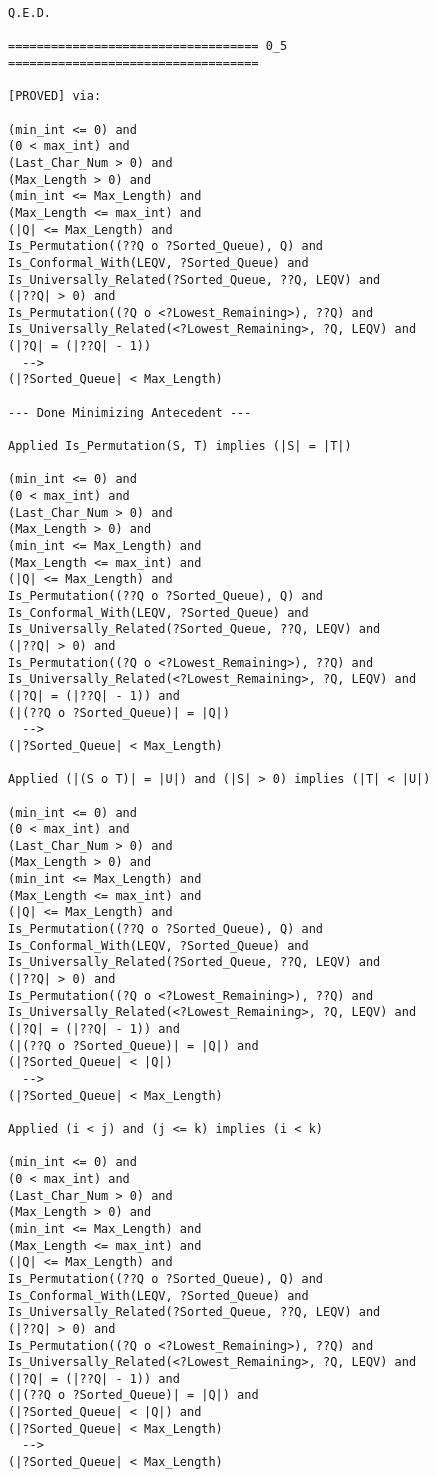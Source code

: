 \begin{lstlisting}[language=resolve]
Q.E.D.

=================================== 0_5 ===================================

[PROVED] via:

(min_int <= 0) and
(0 < max_int) and
(Last_Char_Num > 0) and
(Max_Length > 0) and
(min_int <= Max_Length) and
(Max_Length <= max_int) and
(|Q| <= Max_Length) and
Is_Permutation((??Q o ?Sorted_Queue), Q) and
Is_Conformal_With(LEQV, ?Sorted_Queue) and
Is_Universally_Related(?Sorted_Queue, ??Q, LEQV) and
(|??Q| > 0) and
Is_Permutation((?Q o <?Lowest_Remaining>), ??Q) and
Is_Universally_Related(<?Lowest_Remaining>, ?Q, LEQV) and
(|?Q| = (|??Q| - 1))
  -->
(|?Sorted_Queue| < Max_Length)

--- Done Minimizing Antecedent ---

Applied Is_Permutation(S, T) implies (|S| = |T|)

(min_int <= 0) and
(0 < max_int) and
(Last_Char_Num > 0) and
(Max_Length > 0) and
(min_int <= Max_Length) and
(Max_Length <= max_int) and
(|Q| <= Max_Length) and
Is_Permutation((??Q o ?Sorted_Queue), Q) and
Is_Conformal_With(LEQV, ?Sorted_Queue) and
Is_Universally_Related(?Sorted_Queue, ??Q, LEQV) and
(|??Q| > 0) and
Is_Permutation((?Q o <?Lowest_Remaining>), ??Q) and
Is_Universally_Related(<?Lowest_Remaining>, ?Q, LEQV) and
(|?Q| = (|??Q| - 1)) and
(|(??Q o ?Sorted_Queue)| = |Q|)
  -->
(|?Sorted_Queue| < Max_Length)

Applied (|(S o T)| = |U|) and (|S| > 0) implies (|T| < |U|)

(min_int <= 0) and
(0 < max_int) and
(Last_Char_Num > 0) and
(Max_Length > 0) and
(min_int <= Max_Length) and
(Max_Length <= max_int) and
(|Q| <= Max_Length) and
Is_Permutation((??Q o ?Sorted_Queue), Q) and
Is_Conformal_With(LEQV, ?Sorted_Queue) and
Is_Universally_Related(?Sorted_Queue, ??Q, LEQV) and
(|??Q| > 0) and
Is_Permutation((?Q o <?Lowest_Remaining>), ??Q) and
Is_Universally_Related(<?Lowest_Remaining>, ?Q, LEQV) and
(|?Q| = (|??Q| - 1)) and
(|(??Q o ?Sorted_Queue)| = |Q|) and
(|?Sorted_Queue| < |Q|)
  -->
(|?Sorted_Queue| < Max_Length)

Applied (i < j) and (j <= k) implies (i < k)

(min_int <= 0) and
(0 < max_int) and
(Last_Char_Num > 0) and
(Max_Length > 0) and
(min_int <= Max_Length) and
(Max_Length <= max_int) and
(|Q| <= Max_Length) and
Is_Permutation((??Q o ?Sorted_Queue), Q) and
Is_Conformal_With(LEQV, ?Sorted_Queue) and
Is_Universally_Related(?Sorted_Queue, ??Q, LEQV) and
(|??Q| > 0) and
Is_Permutation((?Q o <?Lowest_Remaining>), ??Q) and
Is_Universally_Related(<?Lowest_Remaining>, ?Q, LEQV) and
(|?Q| = (|??Q| - 1)) and
(|(??Q o ?Sorted_Queue)| = |Q|) and
(|?Sorted_Queue| < |Q|) and
(|?Sorted_Queue| < Max_Length)
  -->
(|?Sorted_Queue| < Max_Length)


\end{lstlisting}

